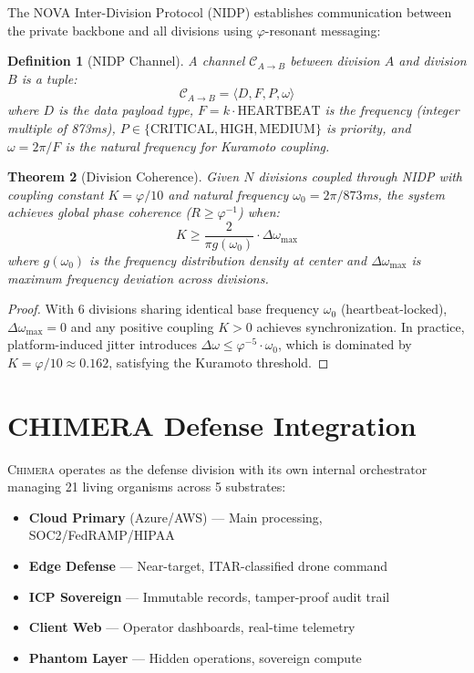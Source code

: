 \documentclass[12pt]{article}
\newtheorem{theorem}{Theorem}
\newtheorem{definition}[theorem]{Definition}
\newcommand{\PHI}{\varphi}
\newcommand{\PHIINV}{\varphi^{-1}}
\newcommand{\CHIMERA}{\textsc{Chimera}}
\begin{document}
The NOVA Inter-Division Protocol (NIDP) establishes communication between the private backbone and all divisions using $\PHI$-resonant messaging:

\begin{definition}[NIDP Channel]
A channel $\mathcal{C}_{A \to B}$ between division $A$ and division $B$ is a tuple:
\[
\mathcal{C}_{A \to B} = \langle D, F, P, \omega \rangle
\]
where $D$ is the data payload type, $F = k \cdot \text{HEARTBEAT}$ is the frequency (integer multiple of 873ms), $P \in \{\text{CRITICAL}, \text{HIGH}, \text{MEDIUM}\}$ is priority, and $\omega = 2\pi / F$ is the natural frequency for Kuramoto coupling.
\end{definition}

\begin{theorem}[Division Coherence]
Given $N$ divisions coupled through NIDP with coupling constant $K = \PHI / 10$ and natural frequency $\omega_0 = 2\pi / 873$ms, the system achieves global phase coherence ($R \geq \PHIINV$) when:
\[
K \geq \frac{2}{\pi g(\omega_0)} \cdot \Delta\omega_{\max}
\]
where $g(\omega_0)$ is the frequency distribution density at center and $\Delta\omega_{\max}$ is maximum frequency deviation across divisions.
\end{theorem}

\begin{proof}
With 6 divisions sharing identical base frequency $\omega_0$ (heartbeat-locked), $\Delta\omega_{\max} = 0$ and any positive coupling $K > 0$ achieves synchronization. In practice, platform-induced jitter introduces $\Delta\omega \leq \PHI^{-5} \cdot \omega_0$, which is dominated by $K = \PHI / 10 \approx 0.162$, satisfying the Kuramoto threshold.
\end{proof}

\section{CHIMERA Defense Integration}

\CHIMERA{} operates as the defense division with its own internal orchestrator managing 21 living organisms across 5 substrates:

\begin{itemize}
    \item \textbf{Cloud Primary} (Azure/AWS) — Main processing, SOC2/FedRAMP/HIPAA
    \item \textbf{Edge Defense} — Near-target, ITAR-classified drone command
    \item \textbf{ICP Sovereign} — Immutable records, tamper-proof audit trail
    \item \textbf{Client Web} — Operator dashboards, real-time telemetry
    \item \textbf{Phantom Layer} — Hidden operations, sovereign compute
\end{itemize}
\end{document}
